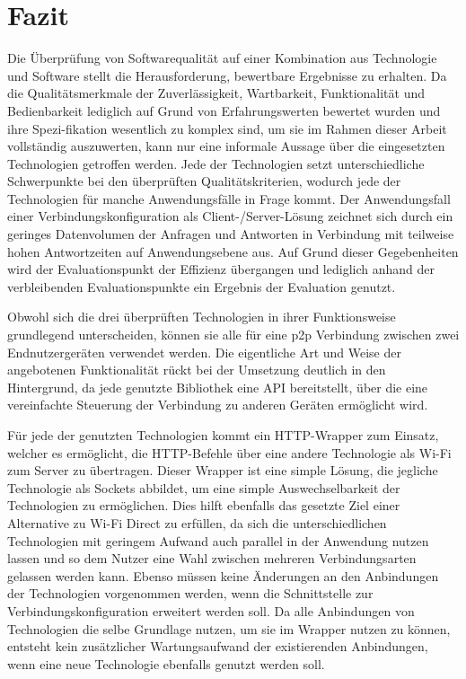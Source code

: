 \section{Fazit}

Die Überprüfung von Softwarequalität auf einer Kombination aus Technologie und Software stellt die Herausforderung, bewertbare Ergebnisse zu erhalten. Da die Qualitätsmerkmale der Zuverlässigkeit, Wartbarkeit, Funktionalität und Bedienbarkeit lediglich auf Grund von Erfahrungswerten bewertet wurden und ihre Spezi-fikation wesentlich zu komplex sind, um sie im Rahmen dieser Arbeit vollständig auszuwerten, kann nur eine informale Aussage über die eingesetzten Technologien getroffen werden. Jede der Technologien setzt unterschiedliche Schwerpunkte bei den überprüften Qualitätskriterien, wodurch jede der Technologien für manche Anwendungsfälle in Frage kommt. Der Anwendungsfall einer Verbindungskonfiguration als Client-/Server-Lösung zeichnet sich durch ein geringes Datenvolumen der Anfragen und Antworten in Verbindung mit teilweise hohen Antwortzeiten auf Anwendungsebene aus. Auf Grund dieser Gegebenheiten wird der Evaluationspunkt der Effizienz übergangen und lediglich anhand der verbleibenden Evaluationspunkte ein Ergebnis der Evaluation genutzt.

Obwohl sich die drei überprüften Technologien in ihrer Funktionsweise grundlegend unterscheiden, können sie alle für eine p2p Verbindung zwischen zwei Endnutzergeräten verwendet werden. Die eigentliche Art und Weise der angebotenen Funktionalität rückt bei der Umsetzung deutlich in den Hintergrund, da jede genutzte Bibliothek eine API bereitstellt, über die eine vereinfachte Steuerung der Verbindung zu anderen Geräten ermöglicht wird.

Für jede der genutzten Technologien kommt ein HTTP-Wrapper zum Einsatz, welcher es ermöglicht, die HTTP-Befehle über eine andere Technologie als Wi-Fi zum Server zu übertragen. Dieser Wrapper ist eine simple Lösung, die jegliche Technologie als Sockets abbildet, um eine simple Auswechselbarkeit der Technologien zu ermöglichen. Dies hilft ebenfalls das gesetzte Ziel einer Alternative zu Wi-Fi Direct zu erfüllen, da sich die unterschiedlichen Technologien mit geringem Aufwand auch parallel in der Anwendung nutzen lassen und so dem Nutzer eine Wahl zwischen mehreren Verbindungsarten gelassen werden kann. Ebenso müssen keine Änderungen an den Anbindungen der Technologien vorgenommen werden, wenn die Schnittstelle zur Verbindungskonfiguration erweitert werden soll. Da alle Anbindungen von Technologien die selbe Grundlage nutzen, um sie im Wrapper nutzen zu können, entsteht kein zusätzlicher Wartungsaufwand der existierenden Anbindungen, wenn eine neue Technologie ebenfalls genutzt werden soll.

